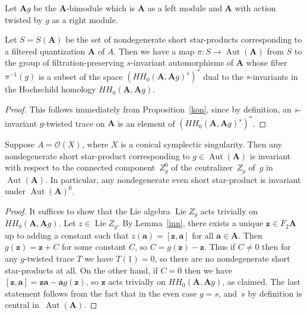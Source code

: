Let ${\mathbf A}g$ be the ${\mathbf A}$-bimodule which is ${\mathbf A}$ as a left module and ${\mathbf A}$ with action twisted by $g$ as a right module.

\begin{Corollary}\label{bun} Let $S=S({\mathbf A})$ be the set of nondegenerate short star-products corresponding to a filtered quantization ${{\mathbf A}}$ of $A$. Then we have a map $\pi\colon S\to \operatorname{Aut}({{\mathbf A}})$ from $S$ to the group of filtration-preserving $s$-invariant automorphisms of ${{\mathbf A}}$ whose fiber $\pi^{-1}(g)$ is a subset of the space $(HH_0({{\mathbf A}},{{\mathbf A}}g)^s)^*$ dual to the $s$-invariants in the Hochschild homology $HH_0({{\mathbf A}},{{\mathbf A}}g)$.
\end{Corollary}

\begin{proof} This follows immediately from Proposition~\ref{kon}, since by definition, an $s$-invariant $g$-twisted trace on ${{\mathbf A}}$ is an element of $(HH_0({{\mathbf A}},{{\mathbf A}}g)^s)^*$.
\end{proof}

\begin{Corollary} \label{bun1} Suppose $A=\mathcal{O}(X)$, where $X$ is a conical symplectic
singularity. Then any nondegenerate short star-product corresponding to $g\in \operatorname{Aut}({{\mathbf A}})$
is invariant with respect to the connected component~$Z_g^0$ of the centralizer~$Z_g$
of~$g$ in $\operatorname{Aut}({{\mathbf A}})$. In particular, any nondegenerate even short star-product
is invariant under $\operatorname{Aut}({\mathbf A})^0$.
\end{Corollary}

\begin{proof} It suffices to show that the Lie algebra $\operatorname{Lie}Z_g$ acts trivially on
$HH_0({\mathbf A},{\mathbf A} g)$. Let $z\in \operatorname{Lie}Z_g$. By Lemma~\ref{inn}, there exists a unique ${\mathbf z}\in F_2{\mathbf A}$ up to adding a constant such that $z({\mathbf a})=[{\mathbf z},{\mathbf a}]$ for all ${\mathbf a}\in {\mathbf A}$. Then $g({\mathbf z})={\mathbf z}+C$ for some constant $C$, so $C=g({\mathbf z})-{\mathbf z}$. Thus if $C\ne 0$ then for any $g$-twisted trace $T$ we have $T(1)=0$, so there are no nondegenerate short star-products at all. On the other hand, if $C=0$ then we have $[{\mathbf z},{\mathbf a}]={\mathbf z}{\mathbf a}-{\mathbf a}g({\mathbf z})$, so ${\mathbf z}$ acts trivially on $HH_0({\mathbf A},{\mathbf A} g)$, as claimed. The last statement follows from the fact that in the even case $g=s$, and~$s$ by definition is central in~$\operatorname{Aut}({{\mathbf A}})$.
\end{proof}

